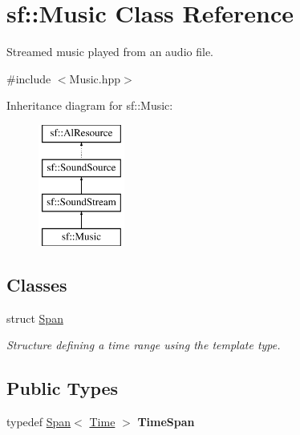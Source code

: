 \hypertarget{classsf_1_1_music}{}\section{sf\+:\+:Music Class Reference}
\label{classsf_1_1_music}


Streamed music played from an audio file.  




{\ttfamily \#include $<$Music.\+hpp$>$}

Inheritance diagram for sf\+:\+:Music\+:\begin{figure}[H]
\begin{center}
\leavevmode
\includegraphics[height=4.000000cm]{classsf_1_1_music}
\end{center}
\end{figure}
\subsection*{Classes}
\begin{DoxyCompactItemize}
\item 
struct \mbox{\hyperlink{structsf_1_1_music_1_1_span}{Span}}
\begin{DoxyCompactList}\small\item\em Structure defining a time range using the template type. \end{DoxyCompactList}\end{DoxyCompactItemize}
\subsection*{Public Types}
\begin{DoxyCompactItemize}
\item 
\mbox{\label{classsf_1_1_music_a87625c59543125c81c380aa37aeb93e7}} 
typedef \mbox{\hyperlink{structsf_1_1_music_1_1_span}{Span}}$<$ \mbox{\hyperlink{classsf_1_1_time}{Time}} $>$ {\bfseries Time\+Span}
\end{DoxyCompactItemize}
